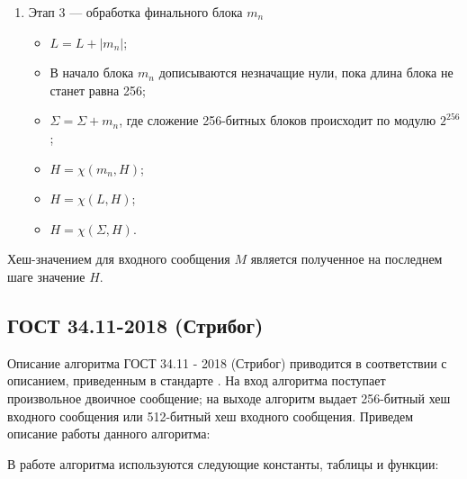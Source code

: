 \documentclass{./civarticle}
\begin{document}
\begin{enumerate}
\begin{enumerate}
        \item Этап 3 --- обработка финального блока $m_n$

        \begin{itemize}
            \item $L = L + |m_n|$;
            \item В начало блока $m_n$ дописываются незначащие нули, пока длина блока не станет равна 256;
            \item $\Sigma = \Sigma + m_n$, где сложение 256-битных блоков происходит по модулю $2^{256}$;
            \item $H = \chi(m_n, H)$;
            \item $H = \chi(L, H)$;
            \item $H = \chi(\Sigma, H)$.
        \end{itemize}
    \end{enumerate}
    Хеш-значением для входного сообщения $M$ является полученное на последнем шаге значение $H$.
\end{enumerate}

\subsection{ГОСТ 34.11-2018 (Стрибог)}

Описание алгоритма ГОСТ 34.11 - 2018 (Стрибог) приводится в соответствии с описанием, приведенным в стандарте \cite{gost2018}. На вход алгоритма поступает произвольное двоичное сообщение; на выходе алгоритм выдает 256-битный хеш входного сообщения или 512-битный хеш входного сообщения. Приведем описание работы данного алгоритма:


В работе алгоритма используются следующие константы, таблицы и функции:
\end{document}
